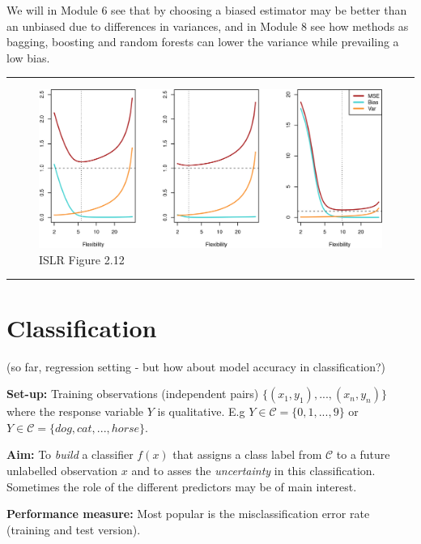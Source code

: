 \documentclass[]{article}
\begin{document}
We will in Module 6 see that by choosing a biased estimator may be
better than an unbiased due to differences in variances, and in Module 8
see how methods as bagging, boosting and random forests can lower the
variance while prevailing a low bias.

\begin{center}\rule{0.5\linewidth}{\linethickness}\end{center}

\begin{figure}
\centering
\includegraphics{../ISLR/Chapter2/2.12.png}
\caption{ISLR Figure 2.12}
\end{figure}

\begin{center}\rule{0.5\linewidth}{\linethickness}\end{center}

\hypertarget{classification}{%
\section{Classification}\label{classification}}

(so far, regression setting - but how about model accuracy in
classification?)

\textbf{Set-up:} Training observations (independent pairs)
\(\{(x_1, y_1), ..., (x_n, y_n)\}\) where the response variable \(Y\) is
qualitative. E.g \(Y \in \mathcal{C} = \{0, 1, ..., 9\}\) or
\(Y \in \mathcal{C} = \{dog, cat,... ,horse\}\).

\textbf{Aim: } To \emph{build} a classifier \(f(x)\) that assigns a
class label from \(\mathcal{C}\) to a future unlabelled observation
\(x\) and to asses the \emph{uncertainty} in this classification.
Sometimes the role of the different predictors may be of main interest.

\textbf{Performance measure:} Most popular is the misclassification
error rate (training and test version).
\end{document}
